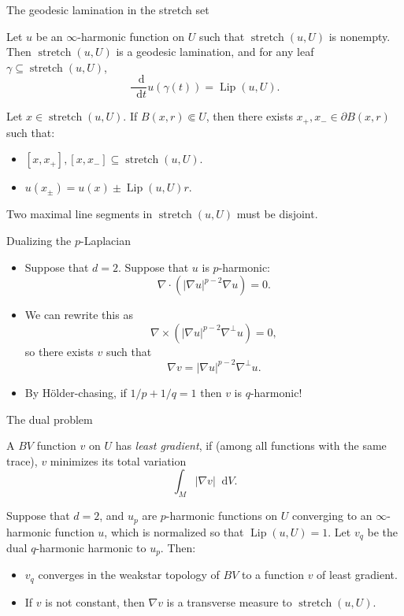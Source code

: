 \documentclass[10pt]{beamer}
\newcommand*\dif{\mathop{}\!\mathrm{d}}
\DeclareMathOperator{\Lip}{Lip}
\DeclareMathOperator{\Stretch}{stretch}
\begin{document}
\begin{frame}{The geodesic lamination in the stretch set}
\begin{theorem}
Let $u$ be an $\infty$-harmonic function on $U$ such that $\Stretch(u, U)$ is nonempty.
Then $\Stretch(u, U)$ is a geodesic lamination, and for any leaf $\gamma \subseteq \Stretch(u, U)$,
$$\frac{\dif}{\dif t} u(\gamma(t)) = \Lip(u, U).$$
\end{theorem}

\begin{lemma}
Let $x \in \Stretch(u, U)$.
If $B(x, r) \Subset U$, then there exists $x_+, x_- \in \partial B(x, r)$ such that:
\begin{itemize}
\item $[x, x_+], [x, x_-] \subseteq \Stretch(u, U)$.
\item $u(x_\pm) = u(x) \pm \Lip(u, U)r$.
\end{itemize}
\end{lemma}

\begin{lemma}
Two maximal line segments in $\Stretch(u, U)$ must be disjoint.
\end{lemma}
\end{frame}

\begin{frame}{Dualizing the $p$-Laplacian}
\begin{itemize}
\item Suppose that $d = 2$. Suppose that $u$ is $p$-harmonic:
$$\nabla \cdot (|\nabla u|^{p - 2} \nabla u) = 0.$$
\item We can rewrite this as
$$\nabla \times (|\nabla u|^{p - 2} \nabla^\perp u) = 0,$$
so there exists $v$ such that
$$\nabla v = |\nabla u|^{p - 2} \nabla^\perp u.$$
\item By H\"older-chasing, if $1/p + 1/q = 1$ then $v$ is $q$-harmonic!
\end{itemize}
\end{frame}

\begin{frame}{The dual problem}
\begin{definition}
A $BV$ function $v$ on $U$ has \emph{least gradient}, if (among all functions with the same trace), $v$ minimizes its total variation
$$\int_M |\nabla v| \dif V.$$
\end{definition}

\begin{theorem}
Suppose that $d = 2$, and $u_p$ are $p$-harmonic functions on $U$ converging to an $\infty$-harmonic function $u$, which is normalized so that $\Lip(u, U) = 1$.
Let $v_q$ be the dual $q$-harmonic harmonic to $u_p$.
Then:
\begin{itemize}
\item $v_q$ converges in the weakstar topology of $BV$ to a function $v$ of least gradient.
\item If $v$ is not constant, then $\nabla v$ is a transverse measure to $\Stretch(u, U)$.
\end{itemize}
\end{theorem}
\end{frame}
\end{document}
